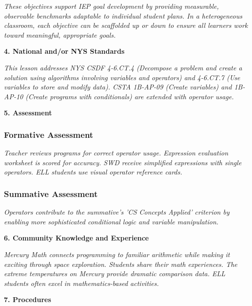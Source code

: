 \documentclass[11pt,letterpaper]{article}
\begin{document}
\textit{These objectives support IEP goal development by providing measurable, observable benchmarks adaptable to individual student plans. In a heterogeneous classroom, each objective can be scaffolded up or down to ensure all learners work toward meaningful, appropriate goals.}

\textbf{4. National and/or NYS Standards}

\textit{This lesson addresses NYS CSDF 4-6.CT.4 (Decompose a problem and create a solution using algorithms involving variables and operators) and 4-6.CT.7 (Use variables to store and modify data). CSTA 1B-AP-09 (Create variables) and 1B-AP-10 (Create programs with conditionals) are extended with operator usage.}

\newpage
\textbf{5. Assessment}

\subsubsection{Formative Assessment}

\textit{Teacher reviews programs for correct operator usage. Expression evaluation worksheet is scored for accuracy. SWD receive simplified expressions with single operators. ELL students use visual operator reference cards.}

\subsubsection{Summative Assessment}

\textit{Operators contribute to the summative's 'CS Concepts Applied' criterion by enabling more sophisticated conditional logic and variable manipulation.}

\textbf{6. Community Knowledge and Experience}

\textit{Mercury Math connects programming to familiar arithmetic while making it exciting through space exploration. Students share their math experiences. The extreme temperatures on Mercury provide dramatic comparison data. ELL students often excel in mathematics-based activities.}

\textbf{7. Procedures}
\end{document}
